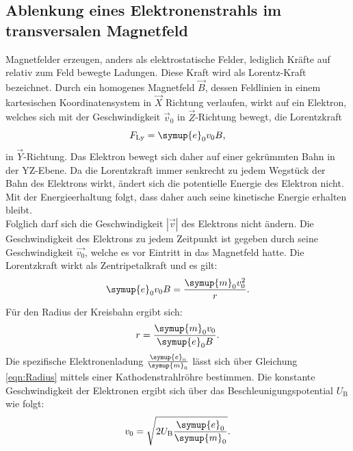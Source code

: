 \subsection{Ablenkung eines Elektronenstrahls im transversalen Magnetfeld}
Magnetfelder erzeugen, anders als elektrostatische Felder, lediglich Kräfte auf relativ zum Feld bewegte Ladungen. Diese Kraft wird als Lorentz-Kraft bezeichnet.
Durch ein homogenes Magnetfeld $\vec{B}$, dessen Feldlinien in einem kartesischen Koordinatensystem in $\vec{X}$ Richtung verlaufen, wirkt auf ein Elektron, welches sich mit der Geschwindigkeit $\vec{v}_0$ in $\vec{Z}$-Richtung bewegt, die Lorentzkraft
\begin{equation}
  F_\mathrm{Ly}=\symup{e}_0v_0B \text{,}
\end{equation}
in $\vec{Y}$-Richtung.
Das Elektron bewegt sich daher auf einer gekrümmten Bahn in der YZ-Ebene.
Da die Lorentzkraft immer senkrecht zu jedem Wegstück der Bahn des Elektrons wirkt, ändert sich die potentielle Energie des Elektron nicht.
Mit der Energieerhaltung folgt, dass daher auch seine kinetische Energie erhalten bleibt.\\
Folglich darf sich die Geschwindigkeit $|\vec{v}|$ des Elektrons nicht ändern.
Die Geschwindigkeit des Elektrons zu jedem Zeitpunkt ist gegeben durch seine Geschwindigkeit $\vec{v_0}$, welche es vor Eintritt in das Magnetfeld hatte.
Die Lorentzkraft wirkt als Zentripetalkraft und es gilt:
\begin{equation}
    \symup{e}_0v_0B=\frac{\symup{m}_0v_0^2}{r} \text{.}
\end{equation}
Für den Radius der Kreisbahn ergibt sich:
\begin{equation}
  \label{eqn:Radius}
	r=\frac{\symup{m}_0v_0}{\symup{e}_0B} \mathrm{.}
\end{equation}
Die spezifische Elektronenladung $\frac{\symup{e}_0}{\symup{m}_0}$ lässt sich über Gleichung \eqref{eqn:Radius} mittels einer Kathodenstrahlröhre bestimmen.
Die konstante Geschwindigkeit der Elektronen ergibt sich über das Beschleunigungspotential $U_\mathrm{B}$ wie folgt:
\begin{equation}
  \label{eqn:vnull}
  v_0=\sqrt{2U_\mathrm{B}\frac{\symup{e}_0}{\symup{m}_0}} \text{.}
\end{equation}

